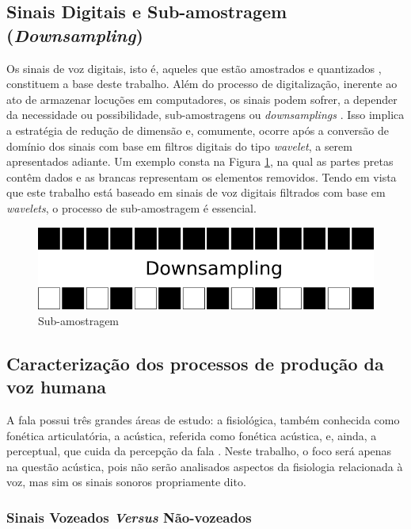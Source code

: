 		\subsection{Sinais Digitais e Sub-amostragem  (\textit{Downsampling})}
			\par Os sinais de voz digitais, isto é, aqueles que estão amostrados e quantizados \cite{haykin2011sistemas}, constituem a base deste trabalho. Além do processo de digitalização, inerente ao ato de armazenar locuções em computadores, os sinais podem sofrer, a depender da necessidade ou possibilidade, sub-amostragens ou \textit{downsamplings} \cite{XXXXXX}. Isso implica a estratégia de redução de dimensão e, comumente, ocorre após a conversão de domínio dos sinais com base em filtros digitais do tipo \textit{wavelet}, a serem apresentados adiante. Um exemplo consta na Figura \ref{fig:downsampling}, na qual as partes pretas contêm dados e as brancas representam os elementos removidos. Tendo em vista que este trabalho está baseado em sinais de voz digitais filtrados com base em \textit{wavelets}, o processo de sub-amostragem é essencial. 
			\begin{figure}[h]
				\centering
				\includegraphics[width=0.7\linewidth]{images/downsampling}
				\caption{Sub-amostragem}
				\label{fig:downsampling}
			\end{figure}
			
		\subsection{Caracterização dos processos de produção da voz humana}
			\par A fala possui três grandes áreas de estudo: a fisiológica, também conhecida como fonética articulatória, a acústica, referida como fonética acústica, e, ainda, a perceptual, que cuida da percepção  da  fala \cite{kremer2014eficiencia}. Neste trabalho, o foco será apenas na questão acústica, pois não serão analisados aspectos da fisiologia relacionada à voz, mas sim os sinais sonoros propriamente dito.
			
			\subsubsection{Sinais Vozeados \textit{Versus} Não-vozeados}

